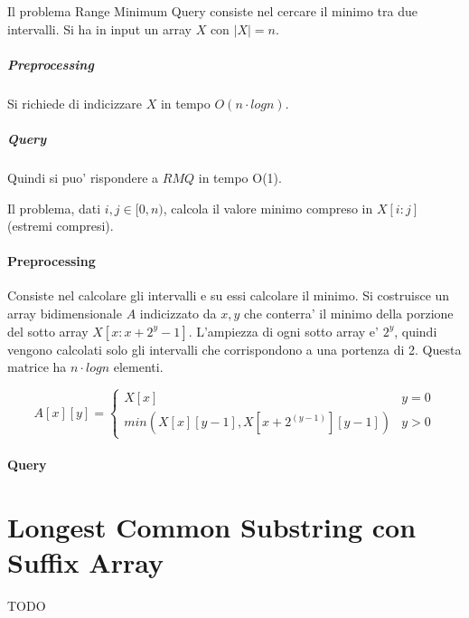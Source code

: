 Il problema Range Minimum Query consiste nel cercare il minimo tra due intervalli.
Si ha in input un array $X$ con $|X| = n$.

\subparagraph{Preprocessing}
Si richiede di indicizzare $X$ in tempo $O(n \cdot log n)$.

\subparagraph{Query}
Quindi si puo' rispondere a $RMQ$ in tempo O(1).

Il problema, dati $i,j \in [0, n)$, calcola il valore minimo compreso in $X[i:j]$ (estremi compresi).

\paragraph{Preprocessing}
Consiste nel calcolare gli intervalli e su essi calcolare il minimo.
Si costruisce un array bidimensionale $A$ indicizzato da $x,y$ che conterra' il minimo della porzione del sotto array $X[x : x + 2^y - 1]$.
L'ampiezza di ogni sotto array e' $2^y$, quindi vengono calcolati solo gli intervalli che corrispondono a una portenza di 2.
Questa matrice ha $n \cdot log n$ elementi.

\[
    A[x][y] =
    \begin{cases}
        \text{$X[x]$} & \text{$y = 0$} \\
        \text{$min(X[x][y-1], X[x+2^(y-1)][y-1])$} & \text{$y > 0$}
    \end{cases}
\]

\paragraph{Query}

\section{Longest Common Substring con Suffix Array}

TODO
